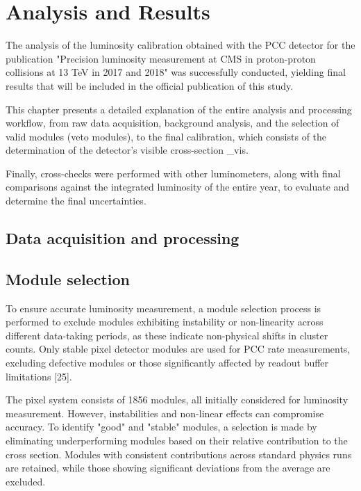 \chapter{Analysis and Results}

The analysis of the luminosity calibration obtained with the PCC detector for the publication "Precision luminosity measurement at CMS in proton-proton collisions at 13 TeV in 2017 and 2018" was successfully conducted, yielding final results that will be included in the official publication of this study.

This chapter presents a detailed explanation of the entire analysis and processing workflow, from raw data acquisition, background analysis, and the selection of valid modules (veto modules), to the final calibration, which consists of the determination of the detector's visible cross-section \sigma_{vis}.

Finally, cross-checks were performed with other luminometers, along with final comparisons against the integrated luminosity of the entire year, to evaluate and determine the final uncertainties.  

\section{Data acquisition and processing}
\label{data}

\section{Module selection}

To ensure accurate luminosity measurement, a module selection process is performed to exclude modules exhibiting instability or non-linearity across different data-taking periods, as these indicate non-physical shifts in cluster counts. Only stable pixel detector modules are used for PCC rate measurements, excluding defective modules or those significantly affected by readout buffer limitations [25].

The pixel system consists of 1856 modules, all initially considered for luminosity measurement. However, instabilities and non-linear effects can compromise accuracy. To identify "good" and "stable" modules, a selection is made by eliminating underperforming modules based on their relative contribution to the cross section. Modules with consistent contributions across standard physics runs are retained, while those showing significant deviations from the average are excluded.


